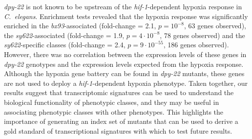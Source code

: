 \documentclass[8pt, twocolumn]{article}
\newcommand{\cel}{\emph{C.~elegans}}
\newcommand{\gene}[1]{\mbox{\emph{#1}}}
\newcommand{\dpy}[1]{\gene{dpy-22#1}}
\begin{document}
\dpy{} is not known to be upstream of the \gene{hif-1}-dependent hypoxia response
in \cel{}. Enrichment tests revealed that the hypoxia response was significantly
enriched in the \emph{bx93}-associated (fold-change = 2.1, $p=10^{-8}$, 63 genes
observed), the \emph{sy622}-associated (fold-change = 1.9, $p=4\cdot10^{-8}$, 78
genes observed) and the \emph{sy622}-specific classes (fold-change = 2.4,
$p=9\cdot10^{-55}$, 186 genes observed). However, there was no correlation
between the expression levels of these genes in \dpy{} genotypes and the
expression levels expected from the hypoxia response. Although the hypoxia gene
battery can be found in \dpy{} mutants, these genes are not used to deploy a
\gene{hif-1}-dependent hypoxia phenotype. Taken together, our results suggest
that transcriptomic signatures can be used to understand the biological
functionality of phenotypic classes, and they may be useful in associating
phenotypic classes with other phenotypes. This highlights the importance of
generating an index set of mutants that can be used to derive a gold standard
of transcriptional signatures with which to test future results.
\end{document}
